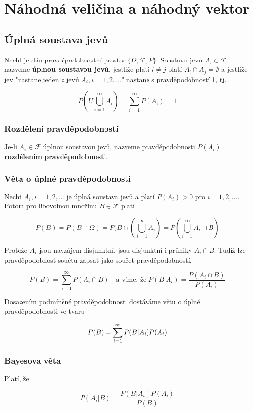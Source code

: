 \chapter{Náhodná veličina a náhodný vektor}
\section{Úplná soustava jevů}
Nechť je dán pravděpodobnostní prostor $\{\Omega,\mathscr{F},P\}$. Soustavu jevů $A_i\in\mathscr{F}$ nazveme \textbf{úplnou soustavou jevů}, jestliže platí $i\neq j$ platí $A_i\cap A_j=\emptyset$ a jestliže jev "nastane jeden z jevů $A_i, i=1,2,\ldots$" nastane s pravděpodobností 1, tj.

\[ P\left(U\bigcup_{i=1}^\infty A_i\right)=\sum_{i=1}^\infty P(A_i)=1 \]

\subsection{Rozdělení pravděpodobností}
Je-li $A_i\in\mathscr{F}$ úplnou soustavou jevů, nazveme pravděpodobnosti $P(A_i)$ \textbf{rozdělením pravděpodobnosti}.

\subsection{Věta o úplné pravděpodobnosti}
Nechť $A_i,i=1,2,\ldots$ je úplná soustava jevů a platí $P(A_i)>0$ pro $i=1,2,\ldots$. Potom pro libovolnou množinu $B\in\mathscr{F}$ platí 

\[ P(B)=P(B\cap \Omega)=P(B\cap \left(\bigcup_{i=1}^\infty A_i\right)=P\left( \bigcup_{i=1}^\infty A_i\cap B\right) \]

Protože $A_i$ jsou navzájem disjunktní, jsou disjunktní i průniky $A_i\cap B$. Tudíž lze pravděpodobnost součtu zapsat jako součet pravděpodobností.

\[ P(B) = \sum_{i=1}^\infty P(A_i\cap B)\quad \text{a víme, že } P(B|A_i)=\frac{P(A_i\cap B)}{P(A_i)} \]

Dosazením podmíněné pravděpodobnosti dostáváme větu o úplné pravděpodobnosti ve tvaru

\[ P(B)=\sum_{i=1}^\infty P(B|A_i)P(A_i) \]

\subsection{Bayesova věta}
Platí, že 

\[ P(A_i|B)=\frac{P(B|A_i)P(A_i)}{P(B)} \]


